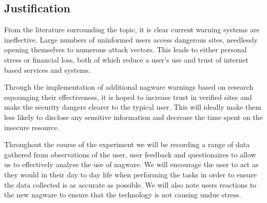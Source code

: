 \documentclass{mpaper}
\begin{document}


\subsection{Justification}
From the literature surrounding the topic, it is clear current warning systems are ineffective. Large numbers of uninformed users access dangerous sites, needlessly opening themselves to numerous attack vectors. This leads to either personal stress or financial loss, both of which reduce a user's use and trust of internet based services and systems. 

Through the implementation of additional nagware warnings based on research espounging their effectiveness, it is hoped to increase trust in verified sites and make the security dangers clearer to the typical user. This will ideally make them less likely to disclose any sensitive information and decrease the time spent on the insecure resource. 

Throughout the course of the experiment we will be recording a range of data gathered from observations of the user, user feedback and questionaires to allow us to effectively analyse the use of nagware. We will encourage the user to act as they would in their day to day life when performing the tasks in order to ensure the data collected is as accurate as possible. We will also note users reactions to the new nagware to ensure that the technology is not causing undue stress. 

\end{document}
